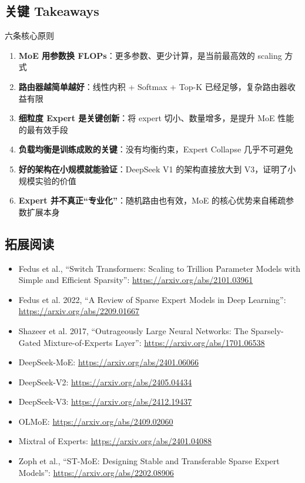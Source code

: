 \subsection{关键 Takeaways}

\begin{importantbox}{六条核心原则}
\begin{enumerate}
    \item \textbf{MoE 用参数换 FLOPs}：更多参数、更少计算，是当前最高效的 scaling 方式
    \item \textbf{路由器越简单越好}：线性内积 + Softmax + Top-K 已经足够，复杂路由器收益有限
    \item \textbf{细粒度 Expert 是关键创新}：将 expert 切小、数量增多，是提升 MoE 性能的最有效手段
    \item \textbf{负载均衡是训练成败的关键}：没有均衡约束，Expert Collapse 几乎不可避免
    \item \textbf{好的架构在小规模就能验证}：DeepSeek V1 的架构直接放大到 V3，证明了小规模实验的价值
    \item \textbf{Expert 并不真正``专业化''}：随机路由也有效，MoE 的核心优势来自稀疏参数扩展本身
\end{enumerate}
\end{importantbox}

\subsection{拓展阅读}

\begin{itemize}
    \item Fedus et al., ``Switch Transformers: Scaling to Trillion Parameter Models with Simple and Efficient Sparsity'': \url{https://arxiv.org/abs/2101.03961}
    \item Fedus et al. 2022, ``A Review of Sparse Expert Models in Deep Learning'': \url{https://arxiv.org/abs/2209.01667}
    \item Shazeer et al. 2017, ``Outrageously Large Neural Networks: The Sparsely-Gated Mixture-of-Experts Layer'': \url{https://arxiv.org/abs/1701.06538}
    \item DeepSeek-MoE: \url{https://arxiv.org/abs/2401.06066}
    \item DeepSeek-V2: \url{https://arxiv.org/abs/2405.04434}
    \item DeepSeek-V3: \url{https://arxiv.org/abs/2412.19437}
    \item OLMoE: \url{https://arxiv.org/abs/2409.02060}
    \item Mixtral of Experts: \url{https://arxiv.org/abs/2401.04088}
    \item Zoph et al., ``ST-MoE: Designing Stable and Transferable Sparse Expert Models'': \url{https://arxiv.org/abs/2202.08906}
\end{itemize}


